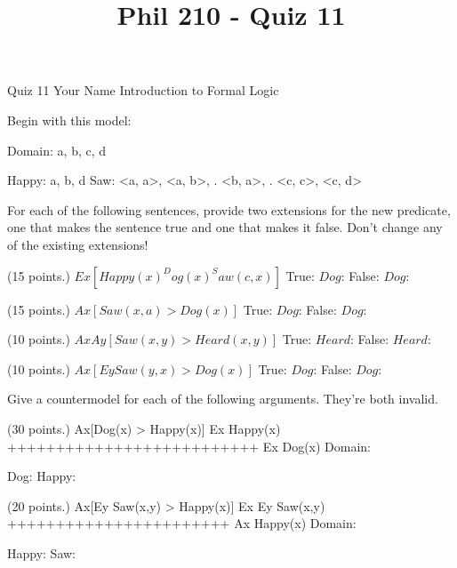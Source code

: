 
\title{Phil 210 - Quiz 11}

\heading
Quiz 11
Your Name
Introduction to Formal Logic
\endheading

Begin with this model:

\answer
        \firstordermodel 
        Domain: a, b, c, d

        Happy:  a, b, d
        Saw:    <a, a>, <a, b>,
           .    <b, a>,
           .    <c, c>, <c, d>
        \endfirstordermodel
\endanswer\bigskip

For each of the following sentences, provide two extensions for the new predicate, one that makes the sentence true and one that makes it false. Don't change any of the existing extensions!

\quantifiers
\problems
{} (15 points.)
$ Ex[Happy(x) ^ Dog(x) ^ Saw(c,x)] $
        \answer
        True: $Dog$: 
        False: $Dog$: 
        \endanswer

 (15 points.)
$ Ax[Saw(x,a) > Dog(x)] $
        \answer
        True: $Dog$: 
        False: $Dog$: 
        \endanswer

 (10 points.)
$ AxAy[Saw(x,y) > Heard(x,y)] $
        \answer\makefomodelangles
        True: $Heard$: 
        False: $Heard$: 
        \endanswer

 (10 points.)
$ Ax[Ey Saw(y,x) > Dog(x)] $
        \answer
        True: $Dog$: 
        False: $Dog$: 
        \endanswer

\endproblems

Give a countermodel for each of the following arguments. They're both invalid.

\problems
{} (30 points.)
\argument
 Ax[Dog(x) > Happy(x)]
 Ex Happy(x)
++++++++++++++++++++++++++
 Ex Dog(x)
\endargument
        \answer
        \firstordermodel
        Domain: 

        Dog:    
        Happy:  
        \endfirstordermodel
        \endanswer

 (20 points.)
\argument
 Ax[Ey Saw(x,y) > Happy(x)]
 Ex Ey Saw(x,y)
+++++++++++++++++++++++
 Ax Happy(x)
\endargument
        \answer
        \firstordermodel
        Domain: 

        Happy:    
        Saw:  
        \endfirstordermodel
        \endanswer

\endproblems
\bye
